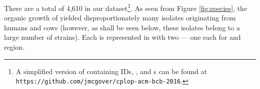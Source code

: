 There are a total of 4,610 \isols{} in our dataset\footnote{A simplified version of \cplop{} containing \isol{} IDs, \spec{}, and \zscore{}s can be found at \texttt{https://github.com/jmcgover/cplop-acm-bcb-2016}.}. As seen from Figure \ref{fig:species},
the organic growth of \cplop{} yielded disproportionately many \ecoli{} isolates originating
from humans and cows (however, as shall be seen below, these isolates belong to a large number of strains). Each \isol{} is represented in \cplop{} with two \pyros{} ---  one each for  and  
region.